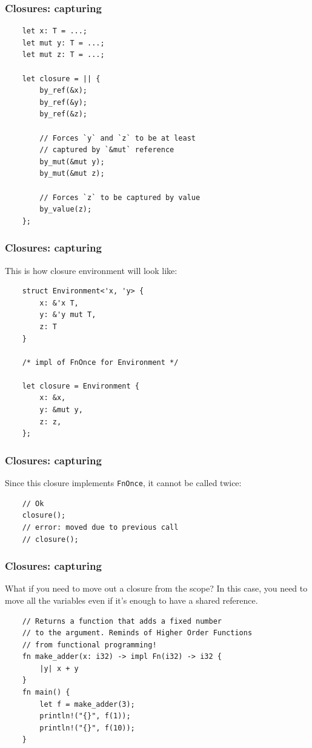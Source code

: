 \documentclass[aspectratio=1610,t]{beamer}
\begin{document}

\begin{frame}[fragile,c]
\frametitle{Closures: capturing}
\begin{verbatim}
    let x: T = ...;
    let mut y: T = ...;
    let mut z: T = ...;

    let closure = || {
        by_ref(&x);
        by_ref(&y);
        by_ref(&z);

        // Forces `y` and `z` to be at least
        // captured by `&mut` reference
        by_mut(&mut y);
        by_mut(&mut z);

        // Forces `z` to be captured by value
        by_value(z);
    };
\end{verbatim}
\end{frame}


\begin{frame}[fragile]
\frametitle{Closures: capturing}
This is how closure environment will look like:

\begin{verbatim}
    struct Environment<'x, 'y> {
        x: &'x T,
        y: &'y mut T,
        z: T
    }

    /* impl of FnOnce for Environment */

    let closure = Environment {
        x: &x,
        y: &mut y,
        z: z,
    };
\end{verbatim}
\end{frame}


\begin{frame}[fragile]
\frametitle{Closures: capturing}
Since this closure implements \texttt{FnOnce}, it cannot be called twice:

\begin{verbatim}
    // Ok
    closure();
    // error: moved due to previous call
    // closure();
\end{verbatim}
\end{frame}


\begin{frame}[fragile,c]
\frametitle{Closures: capturing}
What if you need to move out a closure from the scope? In this case, you need to move all the variables even if it's enough to have a shared reference.

\begin{verbatim}
    // Returns a function that adds a fixed number
    // to the argument. Reminds of Higher Order Functions
    // from functional programming!
    fn make_adder(x: i32) -> impl Fn(i32) -> i32 {
        |y| x + y
    }
    fn main() {
        let f = make_adder(3);
        println!("{}", f(1));  
        println!("{}", f(10));  
    }
\end{verbatim}
\end{frame}
\end{document}
